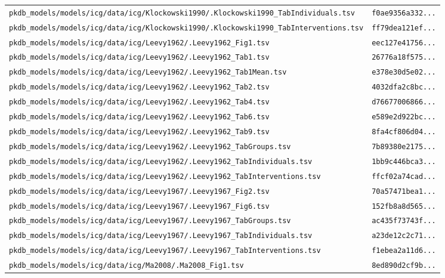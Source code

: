 \begin{longtable}{ll}
\texttt{pkdb\_models/models/icg/data/icg/Klockowski1990/.Klockowski1990\_TabIndividuals.tsv} & \texttt{f0ae9356a332...} \\
\texttt{pkdb\_models/models/icg/data/icg/Klockowski1990/.Klockowski1990\_TabInterventions.tsv} & \texttt{ff79dea121ef...} \\
\texttt{pkdb\_models/models/icg/data/icg/Leevy1962/.Leevy1962\_Fig1.tsv} & \texttt{eec127e41756...} \\
\texttt{pkdb\_models/models/icg/data/icg/Leevy1962/.Leevy1962\_Tab1.tsv} & \texttt{26776a18f575...} \\
\texttt{pkdb\_models/models/icg/data/icg/Leevy1962/.Leevy1962\_Tab1Mean.tsv} & \texttt{e378e30d5e02...} \\
\texttt{pkdb\_models/models/icg/data/icg/Leevy1962/.Leevy1962\_Tab2.tsv} & \texttt{4032dfa2c8bc...} \\
\texttt{pkdb\_models/models/icg/data/icg/Leevy1962/.Leevy1962\_Tab4.tsv} & \texttt{d76677006866...} \\
\texttt{pkdb\_models/models/icg/data/icg/Leevy1962/.Leevy1962\_Tab6.tsv} & \texttt{e589e2d922bc...} \\
\texttt{pkdb\_models/models/icg/data/icg/Leevy1962/.Leevy1962\_Tab9.tsv} & \texttt{8fa4cf806d04...} \\
\texttt{pkdb\_models/models/icg/data/icg/Leevy1962/.Leevy1962\_TabGroups.tsv} & \texttt{7b89380e2175...} \\
\texttt{pkdb\_models/models/icg/data/icg/Leevy1962/.Leevy1962\_TabIndividuals.tsv} & \texttt{1bb9c446bca3...} \\
\texttt{pkdb\_models/models/icg/data/icg/Leevy1962/.Leevy1962\_TabInterventions.tsv} & \texttt{ffcf02a74cad...} \\
\texttt{pkdb\_models/models/icg/data/icg/Leevy1967/.Leevy1967\_Fig2.tsv} & \texttt{70a57471bea1...} \\
\texttt{pkdb\_models/models/icg/data/icg/Leevy1967/.Leevy1967\_Fig6.tsv} & \texttt{152fb8a8d565...} \\
\texttt{pkdb\_models/models/icg/data/icg/Leevy1967/.Leevy1967\_TabGroups.tsv} & \texttt{ac435f73743f...} \\
\texttt{pkdb\_models/models/icg/data/icg/Leevy1967/.Leevy1967\_TabIndividuals.tsv} & \texttt{a23de12c2c71...} \\
\texttt{pkdb\_models/models/icg/data/icg/Leevy1967/.Leevy1967\_TabInterventions.tsv} & \texttt{f1ebea2a11d6...} \\
\texttt{pkdb\_models/models/icg/data/icg/Ma2008/.Ma2008\_Fig1.tsv} & \texttt{8ed890d2cf9b...} \\

\end{longtable}

